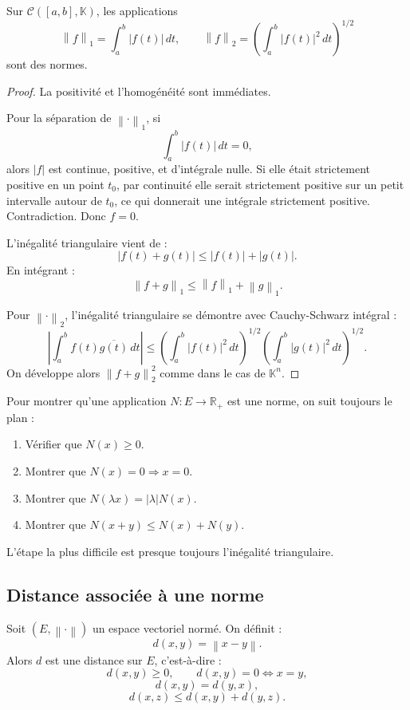 \documentclass[11pt,a4paper]{article}
\newcommand{\K}{\mathbb K}
\newcommand{\R}{\mathbb R}
\newcommand{\norme}[1]{\left\lVert #1 \right\rVert}
\begin{document}
\begin{theorembox}
Sur \(\mathcal C([a,b],\K)\), les applications
\[
\norme{f}_1=\int_a^b |f(t)|\,dt,
\qquad
\norme{f}_2=\left(\int_a^b |f(t)|^2\,dt\right)^{1/2}
\]
sont des normes.
\end{theorembox}

\begin{proof}
La positivité et l'homogénéité sont immédiates.

Pour la séparation de \(\norme{\cdot}_1\), si
\[
\int_a^b |f(t)|\,dt=0,
\]
alors \(|f|\) est continue, positive, et d'intégrale nulle. Si elle était strictement positive en un point \(t_0\), par continuité elle serait strictement positive sur un petit intervalle autour de \(t_0\), ce qui donnerait une intégrale strictement positive. Contradiction. Donc \(f=0\).

L'inégalité triangulaire vient de :
\[
|f(t)+g(t)|\leq |f(t)|+|g(t)|.
\]
En intégrant :
\[
\norme{f+g}_1\leq \norme{f}_1+\norme{g}_1.
\]

Pour \(\norme{\cdot}_2\), l'inégalité triangulaire se démontre avec Cauchy-Schwarz intégral :
\[
\left|\int_a^b f(t)\overline{g(t)}\,dt\right|
\leq
\left(\int_a^b |f(t)|^2\,dt\right)^{1/2}
\left(\int_a^b |g(t)|^2\,dt\right)^{1/2}.
\]
On développe alors \(\norme{f+g}_2^2\) comme dans le cas de \(\K^n\).
\end{proof}

\begin{methodbox}
Pour montrer qu'une application \(N:E\to\R_+\) est une norme, on suit toujours le plan :
\begin{enumerate}
    \item Vérifier que \(N(x)\geq 0\).
    \item Montrer que \(N(x)=0\Rightarrow x=0\).
    \item Montrer que \(N(\lambda x)=|\lambda|N(x)\).
    \item Montrer que \(N(x+y)\leq N(x)+N(y)\).
\end{enumerate}
L'étape la plus difficile est presque toujours l'inégalité triangulaire.
\end{methodbox}

\subsection{Distance associée à une norme}

\begin{definitionbox}
Soit \((E,\norme{\cdot})\) un espace vectoriel normé.  
On définit :
\[
d(x,y)=\norme{x-y}.
\]
Alors \(d\) est une distance sur \(E\), c'est-à-dire :
\[
d(x,y)\geq 0,\qquad d(x,y)=0\Longleftrightarrow x=y,
\]
\[
d(x,y)=d(y,x),
\]
\[
d(x,z)\leq d(x,y)+d(y,z).
\]
\end{definitionbox}
\end{document}
